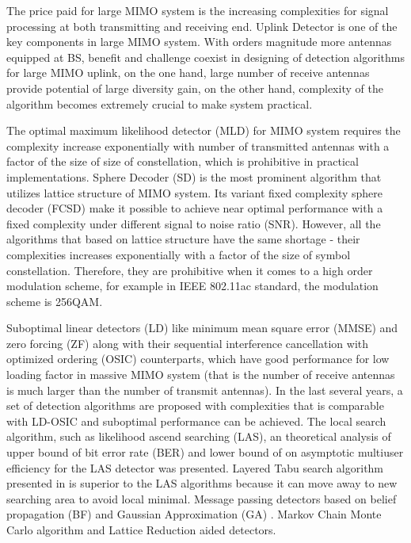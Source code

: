 \documentclass[12pt, draftclsnofoot, onecolumn]{IEEEtran}
\begin{document}
\begin{spacing}{2}
  The price paid for large MIMO system is the increasing complexities for signal processing at both transmitting and receiving end. Uplink Detector is one of the key components in large MIMO system. With orders magnitude more antennas equipped at BS, benefit and challenge coexist in designing of detection algorithms for large MIMO uplink, on the one hand, large number of receive antennas provide potential of large diversity gain, on the other hand, complexity of the algorithm becomes extremely crucial to make system practical. 
  
The optimal maximum likelihood detector (MLD) for MIMO system requires the complexity increase exponentially with number of transmitted antennas with a factor of the size of size of constellation, which is prohibitive in practical implementations. 
Sphere Decoder (SD)\cite{damen2003maximum} is the most prominent algorithm that utilizes lattice structure of MIMO system. 
Its variant fixed complexity sphere decoder (FCSD)\cite{barbero2008fixing} make it possible to achieve near optimal performance with a fixed complexity under different signal to noise ratio (SNR). However, all the algorithms that based on lattice structure have the same shortage - their complexities increases exponentially with a factor of the size of symbol constellation. Therefore, they are prohibitive when it comes to a high order modulation scheme, for example in IEEE 802.11ac standard\cite{IEEE802.11ac}, the modulation scheme is 256QAM. 
 
Suboptimal linear detectors (LD) like minimum mean square error (MMSE) and zero forcing (ZF) along with their sequential interference cancellation with optimized ordering (OSIC) counterparts\cite{wolniansky1998v}\cite{foschini1999simplified}\cite{benesty2003fast}, which have good performance for low loading factor in massive MIMO system (that is the number of receive antennas is much larger than the number of transmit antennas)\cite{hoydis2013massive}. In the last several years, a set of detection algorithms are proposed with complexities that is comparable with LD-OSIC and suboptimal performance can be achieved.  The local search algorithm, such as likelihood ascend searching (LAS)\cite{vardhan2008low}\cite{li2010multiple}, an theoretical analysis of upper bound of bit error rate (BER) and lower bound of on asymptotic multiuser efficiency for the LAS detector was presented\cite{sunfamily}. Layered Tabu search algorithm presented in\cite{srinidhi2011layered} is superior to the LAS algorithms because it can move away to new searching area to avoid local minimal. Message passing detectors based on belief propagation (BF) and Gaussian Approximation (GA) \cite{goldberger2011mimo}\cite{som2011low}\cite{narasimhan2014channel}\cite{som2010improved}. Markov Chain Monte Carlo algorithm\cite{datta2013novel}  and Lattice Reduction aided detectors\cite{zhou2013element}.


\end{spacing}
\end{document}
